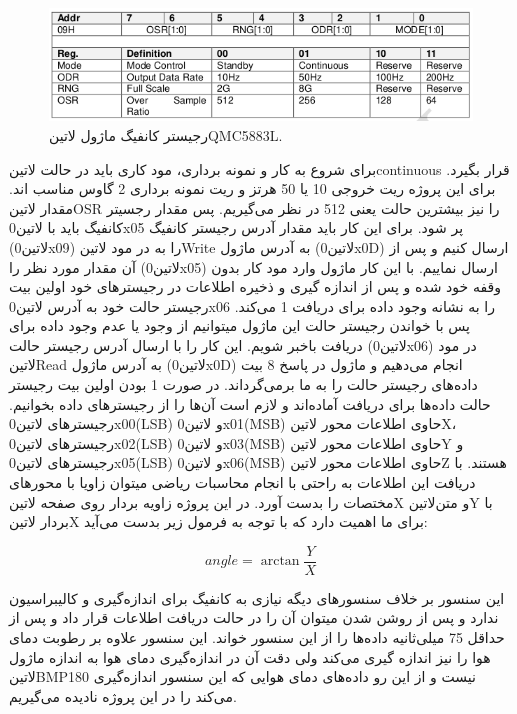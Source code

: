 \begin{figure}[H]
	\centering
	\includegraphics[width=0.9\linewidth]{Assets/QMC5883LControlRegister.png}
	\caption{رجیستر کانفیگ ماژول ‌لاتین{QMC5883L}.}
	\label{fig:QMC5883LControlRegister}
\end{figure}
\noindent
برای شروع به کار و نمونه برداری، مود کاری باید در حالت ‌لاتین{continuous} قرار بگیرد.  برای این پروژه ریت خروجی 10 یا 50 هرتز و ریت نمونه برداری 2 گاوس مناسب اند. مقدار ‌لاتین{OSR} را نیز بیشترین حالت یعنی 512 در نظر می‌گیریم. پس مقدار رجسیتر کانفیگ باید با ‌لاتین{0x05} پر شود. برای این کار باید مقدار آدرس رجیستر کانفیگ (‌لاتین{0x09}) را به در مود ‌لاتین{Write} به آدرس ماژول (‌لاتین{0x0D}) ارسال کنیم و پس از آن مقدار مورد نظر را (‌لاتین{0x05}) ارسال نماییم. با این کار ماژول وارد مود کار بدون وقفه خود شده و پس از اندازه گیری‌ و ذخیره اطلاعات در رجیستر‌های خود اولین بیت رجیستر حالت خود به آدرس ‌لاتین{0x06} را به نشانه وجود داده برای دریافت 1 می‌کند. پس با خواندن رجیستر حالت این ماژول میتوانیم از وجود یا عدم وجود داده برای دریافت باخبر شویم. این کار را با ارسال آدرس رجیستر حالت (‌لاتین{0x06}) در مود ‌لاتین{Read} به آدرس ماژول (‌لاتین{0x0D}) انجام می‌دهیم و ماژول در پاسخ 8 بیت داده‌های رجیستر حالت را به ما برمی‌گرداند. در صورت 1 بودن اولین بیت رجیستر حالت داده‌ها برای دریافت آماده‌اند و لازم است آن‌ها را از رجیستر‌های داده بخوانیم. رجیستر‌های ‌لاتین{0x00(LSB)} و ‌لاتین{0x01(MSB)} حاوی اطلاعات محور ‌لاتین{X}، رجیستر‌های ‌لاتین{0x02(LSB)} و ‌لاتین{0x03(MSB)} حاوی اطلاعات محور ‌لاتین{Y} و رجیستر‌های ‌لاتین{0x05(LSB)} و ‌لاتین{0x06(MSB)} حاوی اطلاعات محور ‌لاتین{Z} هستند. با دریافت این اطلاعات به راحتی با انجام محاسبات ریاضی میتوان زاویا با محور‌های مختصات را بدست آورد. در این پروژه زاویه بردار روی صفحه ‌لاتین{X} و متن‌لاتین{Y} با بردار ‌لاتین{X} برای ما اهمیت دارد که با توجه به فرمول زیر بدست می‌آید:

\begin{fleqn}
	\begin{equation*}
		angle = \arctan{\frac{Y}{X}}
	\end{equation*}
\end{fleqn}

این سنسور بر خلاف سنسور‌های دیگه نیازی به کانفیگ برای اندازه‌گیری و کالیبراسیون ندارد و پس از روشن شدن میتوان آن را در حالت دریافت اطلاعات قرار داد و پس از حداقل 75 میلی‌ثانیه داده‌ها را از این سنسور خواند. این سنسور علاوه بر رطوبت دمای هوا را نیز اندازه گیری می‌کند ولی دقت آن در اندازه‌گیری دمای هوا به اندازه ماژول ‌لاتین{BMP180} نیست و از این رو داده‌های دمای هوایی که این سنسور اندازه‌گیری می‌کند را در این پروژه نادیده می‌گیریم.

